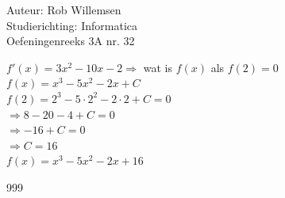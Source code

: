 \documentclass[a4paper]{article}
\begin{document}
\noindent \large Auteur: Rob Willemsen \\
\noindent \large Studierichting: Informatica \\
\noindent \large Oefeningenreeks 3A nr. 32 \\

\medskip

\normalsize

$f'(x) = 3x^2 - 10x - 2 \Rightarrow$ wat is $f(x)$ als $f(2) = 0$ \\

$f(x) = x^3 - 5x^2 - 2x + C$ \\

$f(2) = 2^3 - 5 \cdot 2^2 - 2 \cdot 2 + C = 0$ \\

$\Rightarrow 8 - 20 - 4 + C = 0$ \\

$\Rightarrow -16 + C = 0$ \\

$\Rightarrow C = 16$ \\

$f(x) = x^3 - 5x^2 - 2x + 16$ \\

\begin{thebibliography}{999}
\end{thebibliography}
\end{document}

